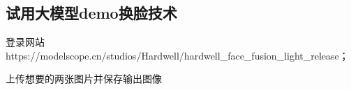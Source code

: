\subsection{试用大模型demo换脸技术}
\begin{enumuate}
	\item 登录网站https://modelscope.cn/studios/Hardwell/hardwell_face_fusion_light_release；
	\item 上传想要的两张图片并保存输出图像
\end{enumuate}